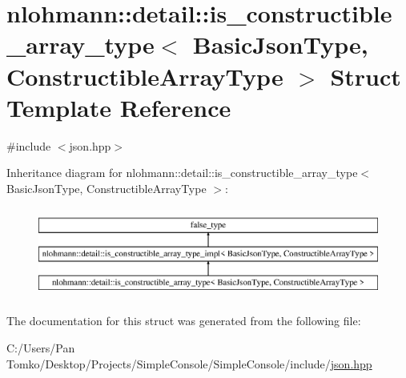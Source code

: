 \hypertarget{structnlohmann_1_1detail_1_1is__constructible__array__type}{}\section{nlohmann\+::detail\+::is\+\_\+constructible\+\_\+array\+\_\+type$<$ Basic\+Json\+Type, Constructible\+Array\+Type $>$ Struct Template Reference}
\label{structnlohmann_1_1detail_1_1is__constructible__array__type}


{\ttfamily \#include $<$json.\+hpp$>$}

Inheritance diagram for nlohmann\+::detail\+::is\+\_\+constructible\+\_\+array\+\_\+type$<$ Basic\+Json\+Type, Constructible\+Array\+Type $>$\+:\begin{figure}[H]
\begin{center}
\leavevmode
\includegraphics[height=3.000000cm]{d3/d52/structnlohmann_1_1detail_1_1is__constructible__array__type}
\end{center}
\end{figure}


The documentation for this struct was generated from the following file\+:\begin{DoxyCompactItemize}
\item 
C\+:/\+Users/\+Pan Tomko/\+Desktop/\+Projects/\+Simple\+Console/\+Simple\+Console/include/\mbox{\hyperlink{json_8hpp}{json.\+hpp}}\end{DoxyCompactItemize}

